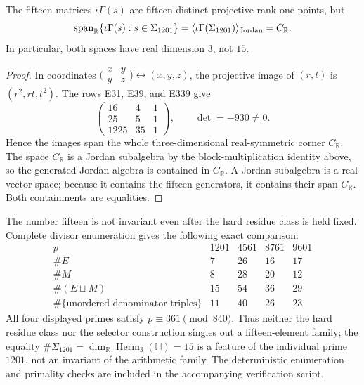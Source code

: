 \begin{theorem}
\label{thm:fifteen-span}
The fifteen matrices $\iota\Gamma(s)$ are fifteen distinct projective
rank-one points, but
\[
 \operatorname{span}_{\mathbb R}\{\iota\Gamma(s):s\in\Sigma_{1201}\}
 =\langle\iota\Gamma(\Sigma_{1201})\rangle_{\rm Jordan}=C_{\mathbb R}.
\]
In particular, both spaces have real dimension $3$, not $15$.
\end{theorem}
\begin{proof}
In coordinates
$\bigl(\begin{smallmatrix}x&y\\y&z\end{smallmatrix}\bigr)
\leftrightarrow(x,y,z)$, the projective image of $(r,t)$ is
$(r^2,rt,t^2)$.  The rows E31, E39, and E339 give
\[
 \begin{pmatrix}16&4&1\\25&5&1\\1225&35&1\end{pmatrix},
 \qquad \det=-930\ne0.
\]
Hence the images span the whole three-dimensional real-symmetric corner
$C_{\mathbb R}$.  The space $C_{\mathbb R}$ is a Jordan subalgebra by the
block-multiplication identity above, so the generated Jordan algebra is
contained in $C_{\mathbb R}$.  A Jordan subalgebra is a real vector space;
because it contains the fifteen generators, it contains their span
$C_{\mathbb R}$.  Both containments are equalities.
\end{proof}

The number fifteen is not invariant even after the hard residue class is held
fixed.  Complete divisor enumeration gives the following exact comparison:
\[
\begin{array}{c|rrrr}
 p&1201&4561&8761&9601\\ \hline
 \#E&7&26&16&17\\
 \#M&8&28&20&12\\
 \#(E\sqcup M)&15&54&36&29\\
 \#\{\text{unordered denominator triples}\}&11&40&26&23
\end{array}
\]
All four displayed primes satisfy $p\equiv361\pmod{840}$.  Thus neither the
hard residue class nor the selector construction singles out a
fifteen-element family; the equality
$\#\Sigma_{1201}=\dim_{\mathbb R}\operatorname{Herm}_3(\mathbb H)=15$ is a
feature of the individual prime $1201$, not an invariant of the arithmetic
family.  The deterministic enumeration and primality checks are included in
the accompanying verification script.

